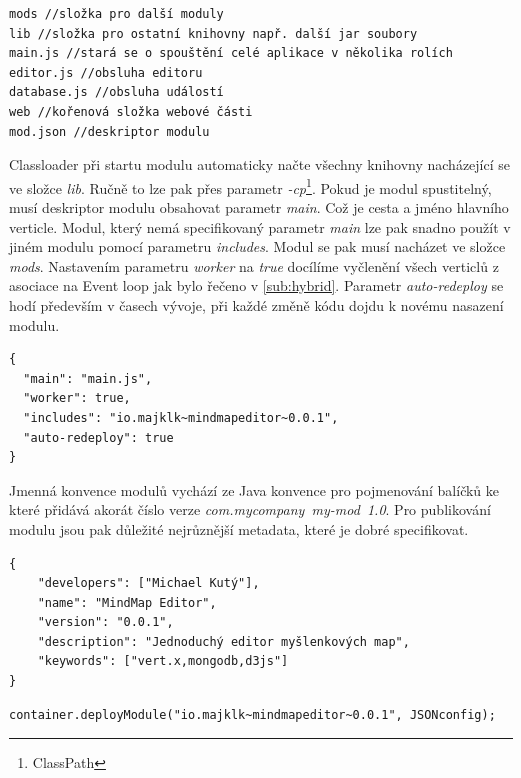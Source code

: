 \begin{lstlisting}
mods //složka pro další moduly
lib //složka pro ostatní knihovny např. další jar soubory
main.js //stará se o spouštění celé aplikace v několika rolích
editor.js //obsluha editoru
database.js //obsluha událostí 
web //kořenová složka webové části
mod.json //deskriptor modulu
\end{lstlisting}

Classloader při startu modulu automaticky načte všechny knihovny nacházející se ve složce \emph{lib}. Ručně to lze pak přes parametr \emph{-cp}\footnote{ClassPath}. Pokud je modul spustitelný, musí deskriptor modulu obsahovat parametr \emph{main}. Což je cesta a jméno hlavního verticle. Modul, který nemá specifikovaný parametr \emph{main} lze pak snadno použít v jiném modulu pomocí parametru \emph{includes}. Modul se pak musí nacházet ve složce \emph{mods}. Nastavením parametru \emph{worker} na \emph{true} docílíme vyčlenění všech verticlů z asociace na Event loop jak bylo řečeno v \ref{sub:hybrid}. Parametr \emph{auto-redeploy} se hodí především v časech vývoje, při každé změně kódu dojdu k novému nasazení modulu. 
\begin{lstlisting}
{
  "main": "main.js",
  "worker": true,
  "includes": "io.majklk~mindmapeditor~0.0.1",
  "auto-redeploy": true
}
\end{lstlisting}

Jmenná konvence modulů vychází ze Java konvence\cite{javaPKG} pro pojmenování balíčků ke které přidává akorát číslo verze \emph{com.mycompany~my-mod~1.0}.
Pro publikování modulu jsou pak důležité nejrůznější metadata, které je dobré specifikovat.
\begin{lstlisting}
{
	"developers": ["Michael Kutý"],
	"name": "MindMap Editor",
	"version": "0.0.1",
	"description": "Jednoduchý editor myšlenkových map",
	"keywords": ["vert.x,mongodb,d3js"]
}  
\end{lstlisting}

\begin{lstlisting}[caption=Spuštění modulu v jazyce Java]
container.deployModule("io.majklk~mindmapeditor~0.0.1", JSONconfig);
\end{lstlisting}

